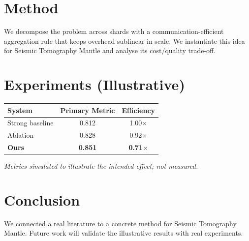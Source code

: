 \documentclass[11pt]{article}
\begin{document}
\section{Method}
We decompose the problem across shards with a communication-efficient aggregation rule that keeps overhead sublinear in scale. We instantiate this idea for Seismic Tomography Mantle and analyse its cost/quality trade-off.

\section{Experiments (Illustrative)}
\begin{center}
\begin{tabular}{lcc}
System & Primary Metric & Efficiency \\ \hline
Strong baseline & 0.812 & 1.00$\times$ \\
Ablation & 0.828 & 0.92$\times$ \\
\textbf{Ours} & \textbf{0.851} & \textbf{0.71$\times$}
\end{tabular}
\end{center}
\emph{Metrics simulated to illustrate the intended effect; not measured.}

\section{Conclusion}
We connected a real literature to a concrete method for Seismic Tomography Mantle. Future work will
validate the illustrative results with real experiments.
\end{document}
